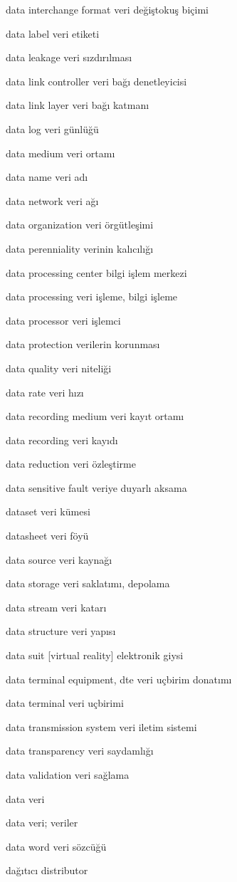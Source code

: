 \documentclass[12pt,fleqn]{article}\usepackage{../../common}
\begin{document}
data interchange format veri değiştokuş biçimi

data label veri etiketi

data leakage veri sızdırılması

data link controller veri bağı denetleyicisi

data link layer veri bağı katmanı

data log veri günlüğü

data medium veri ortamı

data name veri adı

data network veri ağı

data organization veri örgütleşimi

data perenniality verinin kalıcılığı

data processing center bilgi işlem merkezi

data processing veri işleme, bilgi işleme

data processor veri işlemci

data protection verilerin korunması

data quality veri niteliği

data rate veri hızı

data recording medium veri kayıt ortamı

data recording veri kayıdı

data reduction veri özleştirme

data sensitive fault veriye duyarlı aksama

dataset veri kümesi

datasheet veri föyü

data source veri kaynağı

data storage veri saklatımı, depolama

data stream veri katarı

data structure veri yapısı

data suit [virtual reality] elektronik giysi

data terminal equipment, dte veri uçbirim donatımı

data terminal veri uçbirimi

data transmission system veri iletim sistemi

data transparency veri saydamlığı

data validation veri sağlama

data veri

data veri; veriler

data word veri sözcüğü

dağıtıcı distributor
\end{document}
